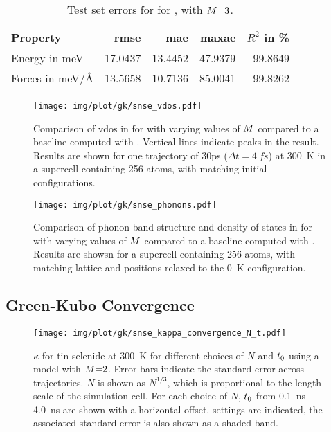 \begin{table}
\label{tab:si-snse_errors_m3}
\caption{Test set errors for \sok for , with $M{=}3$.}
\begin{tabular}{l | r r r r}
\toprule
Property & \acs{rmse} & \acs{mae} & \acs{maxae} & $R^2$ in \unit{\percent} \\
\midrule
Energy in \unit{meV} & \num{17.0437} & \num{13.4452} & \num{47.9379} & \num{99.8649} \\
Forces in \unit{meV/\angstrom} & \num{13.5658} & \num{10.7136} & \num{85.0041 } & \num{99.8262} \\
\bottomrule
\end{tabular}
\end{table}

\vspace{\baselineskip}

\begin{figure}
  \texttt{[image: img/plot/gk/snse\_vdos.pdf]}
  \caption{
  Comparison of \gls{vdos} in  for \sok with varying values of $M$ compared to a baseline computed with \aims.
  Vertical lines indicate peaks in the \aims result.
  Results are shown for one trajectory of \si{30}{ps} ($\Delta t{=}\SI{4}{fs}$) at \SI{300}{K} in a supercell containing \num{256} atoms, with matching initial configurations.
  }
  \label{fig:gko_snse_vdos}
\end{figure}


\begin{figure}
  \texttt{[image: img/plot/gk/snse\_phonons.pdf]}
  \caption{
  Comparison of phonon band structure and density of states in  for \sok with varying values of $M$ compared to a baseline computed with \aims.
  Results are showsn for a supercell containing \num{256} atoms, with matching lattice and positions relaxed to the \qty{0}{K} configuration.
  }
  \label{fig:gko_snse_phonons}
\end{figure}

\clearpage
\subsection{Green-Kubo Convergence}

\begin{figure}
  \texttt{[image: img/plot/gk/snse\_kappa\_convergence\_N\_t.pdf]}
  \caption{
  $\kappa$ for tin selenide at \qty{300}{K} for different choices of $N$ and $t_0$ using a \sok model with $M{=}2$.
  Error bars indicate the standard error across trajectories.
  $N$ is shown as $N^{1/3}$, which is proportional to the length scale of the simulation cell.
  For each choice of $N$, $t_0$ from \qtyrange{0.1}{4.0}{ns} are shown with a horizontal offset.
   settings are indicated, the associated standard error is also shown as a shaded band.
  }
  \label{fig:gko_snse_kappa_convergence_N_t}
\end{figure}

